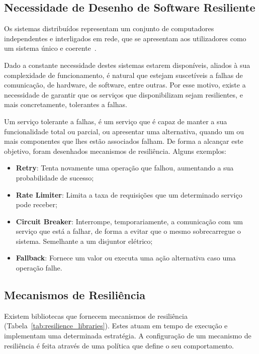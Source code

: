 \subsection{Necessidade de Desenho de Software Resiliente}\label{subsec:necessidade-de-desenho-de-software-resiliente}
Os sistemas distribuídos representam um conjunto de computadores independentes e interligados em rede, que se apresentam aos utilizadores como um sistema único e coerente~\cite{fcc-distributed-systems}.

Dado a constante necessidade destes sistemas estarem disponíveis, aliados à sua complexidade de funcionamento, é natural que estejam suscetíveis a falhas de comunicação, de hardware, de software, entre outras.
Por esse motivo, existe a necessidade de garantir que os serviços que disponibilizam sejam resilientes, e mais concretamente, tolerantes a falhas.

Um serviço tolerante a falhas, é um serviço que é capaz de manter a sua funcionalidade total ou parcial, ou apresentar uma alternativa, quando um ou mais componentes que lhes estão associados falham.
De forma a alcançar este objetivo, foram desenhados mecanismos de resiliência.
Alguns exemplos:

\begin{itemize}[topsep=0pt,itemsep=0pt,partopsep=0pt, parsep=0pt]
    \item \textbf{Retry}: Tenta novamente uma operação que falhou, aumentando a sua probabilidade de sucesso;
    \item \textbf{Rate Limiter}: Limita a taxa de requisições que um determinado serviço pode receber;
    \item \textbf{Circuit Breaker}: Interrompe, temporariamente, a comunicação com um serviço que está a falhar, de forma a evitar que o mesmo sobrecarregue o sistema. Semelhante a um disjuntor elétrico;
    \item \textbf{Fallback}: Fornece um valor ou executa uma ação alternativa caso uma operação falhe.
\end{itemize}

\subsection{Mecanismos de Resiliência}\label{subsec:bibliotecas-que-fornecem-mecanismos-de-resiliencia}

Existem bibliotecas que fornecem mecanismos de resiliência (Tabela~\ref{tab:resilience_libraries}).
Estes atuam em tempo de execução e implementam uma determinada estratégia.
A configuração de um mecanismo de resiliência é feita através de uma política que define o seu comportamento.

